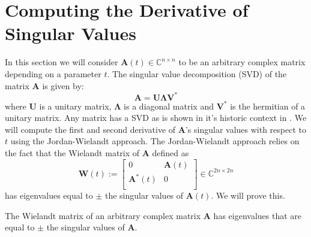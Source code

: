 \documentclass[a4paper, oneside]{thirdparty_stylesheets/discothesis}
\begin{document}
\section{Computing the Derivative of Singular Values} \label{sec:svder}
In this section we will consider $\mathbf{A}(t) \in \mathbb{C}^{n \times n}$ to be an arbitrary complex matrix depending on a parameter $t$.
The singular value decomposition (SVD) of the matrix  $\mathbf{A}$ is given by:
\begin{equation}
	\mathbf{A} = \mathbf{U}\boldsymbol{\Lambda}\mathbf{V}^* \label{svd}
\end{equation}
where $\mathbf{U}$ is a unitary matrix, $\boldsymbol{\Lambda}$ is a diagonal matrix and $\mathbf{V}^*$ is the hermitian of a unitary matrix. 
Any matrix has a SVD as is shown in it's historic context in \cite{Stewart92onthe}.
We will compute the first and second derivative of $\mathbf{A}$'s singular values with respect to $t$ using the Jordan-Wielandt approach.
The Jordan-Wielandt approach relies on the fact that the Wielandt matrix of $\mathbf{A}$ defined as
\begin{equation}
	\mathbf{W}(t) := 
	\begin{bmatrix}
		0 & \mathbf{A}(t) \\
		\mathbf{A}^*(t) & 0 \\
	\end{bmatrix}
	\in \mathbb{C}^{2n \times 2n}
\end{equation}
has eigenvalues equal to $\pm$ the singular values of $\mathbf{A}(t)$.
We will prove this.
\begin{theorem}\label{thm:svd}
	The Wielandt matrix of an arbitrary complex matrix $\mathbf{A}$ has eigenvalues that are equal to $\pm$ the singular values of $\mathbf{A}$.
\end{theorem}
\end{document}

